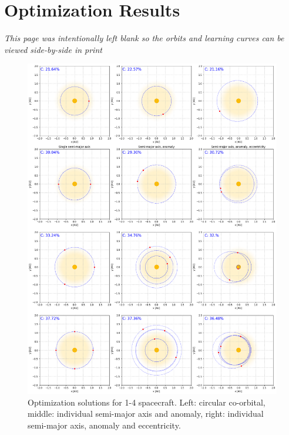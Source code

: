 \chapter{Optimization Results}
\label{ch:appendix}

\textit{This page was intentionally left blank so the orbits and learning curves can be viewed side-by-side in print}

\begin{figure}[p]
 \centering
 \includegraphics[width=1.0\textwidth]{img/appendix_orbit_1.png}
 \caption{Optimization solutions for 1-4 spacecraft. Left: circular co-orbital, middle: individual semi-major axis and anomaly, right: individual semi-major axis, anomaly and eccentricity.}
\end{figure}

